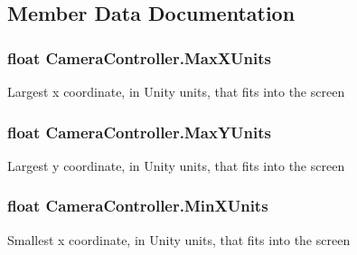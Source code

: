\subsection{Member Data Documentation}
\subsubsection[{\texorpdfstring{Max\+X\+Units}{MaxXUnits}}]{\setlength{\rightskip}{0pt plus 5cm}float Camera\+Controller.\+Max\+X\+Units\hspace{0.3cm}{\ttfamily [static]}}\hypertarget{class_camera_controller_a6b97db2514a3f59c74eb56a013e00c85}{}\label{class_camera_controller_a6b97db2514a3f59c74eb56a013e00c85}


Largest x coordinate, in Unity units, that fits into the screen 

\subsubsection[{\texorpdfstring{Max\+Y\+Units}{MaxYUnits}}]{\setlength{\rightskip}{0pt plus 5cm}float Camera\+Controller.\+Max\+Y\+Units\hspace{0.3cm}{\ttfamily [static]}}\hypertarget{class_camera_controller_a1467ca3823ce8566582bcb6a37d19913}{}\label{class_camera_controller_a1467ca3823ce8566582bcb6a37d19913}


Largest y coordinate, in Unity units, that fits into the screen 

\subsubsection[{\texorpdfstring{Min\+X\+Units}{MinXUnits}}]{\setlength{\rightskip}{0pt plus 5cm}float Camera\+Controller.\+Min\+X\+Units\hspace{0.3cm}{\ttfamily [static]}}\hypertarget{class_camera_controller_afbf830e2978734f35fb745fd63d13ca4}{}\label{class_camera_controller_afbf830e2978734f35fb745fd63d13ca4}


Smallest x coordinate, in Unity units, that fits into the screen 

